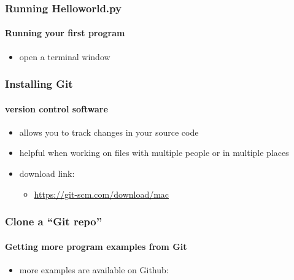 \documentclass{beamer}
\begin{document}



    \begin{frame}
	    \frametitle{Running Helloworld.py}
	    \framesubtitle{Running your first program}
	    \begin{itemize}
		    \item open a terminal window
	    \end{itemize}
	    \lstE
    \end{frame}

    
    \begin{frame}
	    \frametitle{Installing Git}
	    \framesubtitle{version control software}

	    \begin{itemize}
		    \item allows you to track changes in your source code
		    \item helpful when working on files with multiple people or in multiple places
		    \item download link:
			    \begin{itemize}
				    \item \url{https://git-scm.com/download/mac}
			    \end{itemize}
	    \end{itemize}
    \end{frame}
    



    \begin{frame}
	    \frametitle{Clone a ``Git repo''}
	    \framesubtitle{Getting more program examples from Git}
	    
	    \begin{itemize}
		    \item more examples are available on Github:
	    \end{itemize}
	    \lstF
    \end{frame}
\end{document}
